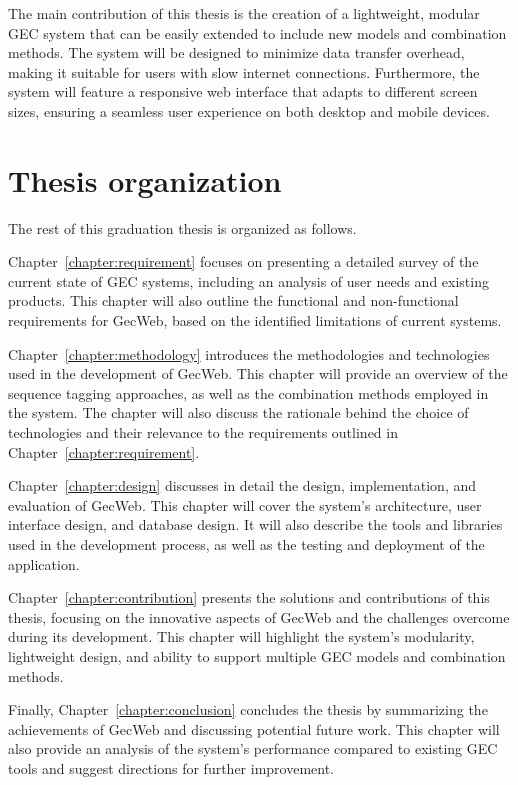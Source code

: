The main contribution of this thesis is the creation of a lightweight, modular GEC system that can be easily extended to include new models and combination methods.
The system will be designed to minimize data transfer overhead, making it suitable for users with slow internet connections.
Furthermore, the system will feature a responsive web interface that adapts to different screen sizes, ensuring a seamless user experience on both desktop and mobile devices.

\section{Thesis organization}
\label{section:organization}

The rest of this graduation thesis is organized as follows.

Chapter~\ref{chapter:requirement} focuses on presenting a detailed survey of the current state of GEC systems, including an analysis of user needs and existing products.
This chapter will also outline the functional and non-functional requirements for GecWeb, based on the identified limitations of current systems.

Chapter~\ref{chapter:methodology} introduces the methodologies and technologies used in the development of GecWeb.
This chapter will provide an overview of the sequence tagging approaches, as well as the combination methods employed in the system.
The chapter will also discuss the rationale behind the choice of technologies and their relevance to the requirements outlined in Chapter~\ref{chapter:requirement}.

Chapter~\ref{chapter:design} discusses in detail the design, implementation, and evaluation of GecWeb.
This chapter will cover the system's architecture, user interface design, and database design.
It will also describe the tools and libraries used in the development process, as well as the testing and deployment of the application.

Chapter~\ref{chapter:contribution} presents the solutions and contributions of this thesis, focusing on the innovative aspects of GecWeb and the challenges overcome during its development.
This chapter will highlight the system's modularity, lightweight design, and ability to support multiple GEC models and combination methods.

Finally, Chapter~\ref{chapter:conclusion} concludes the thesis by summarizing the achievements of GecWeb and discussing potential future work.
This chapter will also provide an analysis of the system's performance compared to existing GEC tools and suggest directions for further improvement.
